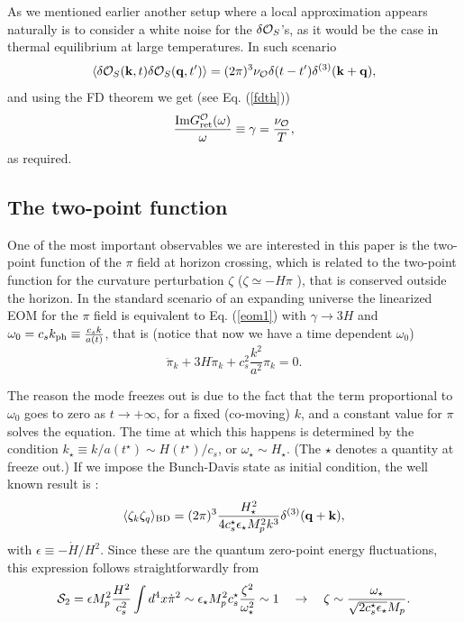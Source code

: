 \documentclass[11pt,amsmath,floats,floatfix,nofootinbib,secnumarabic, superscriptaddress, tightenlines]{revtex4}
\newcommand{\beq}{\begin{equation}}
\newcommand{\eeq}{\end{equation}}
\newcommand{\calo}{{\cal O}}
\begin{document}
As we mentioned earlier another setup where a local approximation appears naturally is to consider a white noise for the $\delta\calo_S$'s, as it would be the case in thermal equilibrium at large temperatures. In such scenario
\beq
\label{dbarh}
\langle \delta\calo_S({\bf{k}},t)\delta\calo_S({\bf{q}},t') \rangle = (2\pi)^3 \nu_{\calo} \delta(t-t')\delta^{(3)}({\bf{k}}+{\bf{q}}),
\eeq
and using the FD theorem we get (see Eq. (\ref{fdth}))
\beq
\label{fdth2}
\frac{{\rm Im}G_{\rm ret}^\calo(\omega)}{\omega} \equiv \gamma = \frac{\nu_{\calo}}{T},
\eeq
 as required.


\subsection{The two-point function}\label{twopoint}

One of the most important observables we are interested in this paper is the two-point function of the $\pi$ field at horizon crossing, which is related to the two-point function for the curvature perturbation $\zeta$ ($\zeta \simeq -H\pi$ \cite{eft1}), that is conserved outside the horizon. In the standard scenario of an expanding universe the linearized EOM for the $\pi$ field is equivalent to Eq. (\ref{eom1}) with $\gamma \to 3H$ and $\omega_0 = c_s k_{\rm ph} \equiv \frac{c_s k}{a(t)}$,
that is (notice that now we have a time dependent $\omega_0$)
\beq
\label{eom1p}
\ddot \pi_k +3H\dot\pi_k + c_s^2 \frac{k^2}{a^2} \pi_k =0.
\eeq

The reason the mode freezes out is due to the fact that the term proportional to $\omega_0$ goes to zero as $t\to +\infty$, for
 a fixed (co-moving) $k$, and a constant value for $\pi$ solves the equation. The time at which this happens is determined
by the condition $k_\star \equiv k/a(t^\star) \sim H(t^\star)/c_s$, or $\omega_\star \sim H_\star$. (The $\star$ denotes a quantity at freeze out.) If we impose the Bunch-Davis state as initial condition, the well known result is \cite{eft1}:
\beq
\label{powersh}
\langle \zeta_k \zeta_q\rangle_{\rm BD} = (2\pi)^3 \frac{H_\star^2}{4c_s^\star\epsilon_\star M^2_pk^3} \delta^{(3)}{({\bf q + k})},
\eeq
with $\epsilon \equiv -\dot H/H^2$. Since these are the quantum zero-point energy fluctuations, this expression follows straightforwardly from
\beq
\label{s2}
{\cal S}_2= \epsilon M_p^2\frac{H^2}{c_s^2}\int d^4 x \dot\pi^2 \sim \epsilon_\star M_p^2 c^\star_s\frac{\zeta^2}{\omega_\star^2} \sim 1 \quad\to\quad \zeta \sim \frac{\omega_\star}{\sqrt{2{c_s^\star}\epsilon_\star}M_p}.
\eeq
\end{document}
